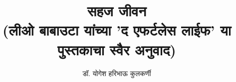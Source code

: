 
\usepackage{fontspec}
\usepackage{tikz}
\usepackage{everypage}

\setmainfont[Script=Devanagari] {Tiro Devanagari Marathi}
\newfontfamily{}
\newfontfamily{}
\graphicspath{{images/}}


\date{} %


\title{
    {\Huge \textbf{सहज जीवन}} \\ 
    \vspace{0.5em}
    {\large (लीओ बाबाउटा यांच्या 'द एफर्टलेस लाईफ' या पुस्तकाचा स्वैर अनुवाद)}
}
\author{\textsc{डॉ. योगेश हरिभाऊ कुलकर्णी}}


\frontmatter
\maketitle


\tableofcontents

\mainmatter




